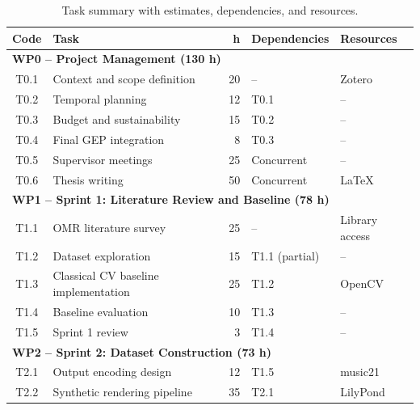 \documentclass[11pt, a4paper]{article}
\begin{document}
\begin{table}[h!]
    \centering
    \caption{Task summary with estimates, dependencies, and resources.}
    \label{tab:task-summary}
    \renewcommand{\arraystretch}{1.05}
    \scriptsize
    \begin{tabularx}{\linewidth}{c >{\raggedright}p{4.2cm} r >{\raggedright\arraybackslash}p{2.2cm} >{\raggedright\arraybackslash}p{2.0cm}}
        \toprule
        \textbf{Code} & \textbf{Task} & \textbf{h} & \textbf{Dependencies} & \textbf{Resources} \\
        \midrule
        \multicolumn{5}{l}{\textbf{WP0 -- Project Management (130 h)}} \\
        \midrule
        T0.1 & Context and scope definition         & 20  & --           & Zotero \\
        T0.2 & Temporal planning                    & 12  & T0.1           & -- \\
        T0.3 & Budget and sustainability             & 15  & T0.2           & -- \\
        T0.4 & Final GEP integration                & 8   & T0.3           & -- \\
        T0.5 & Supervisor meetings                  & 25  & Concurrent     & -- \\
        T0.6 & Thesis writing                       & 50  & Concurrent     & LaTeX \\
        \midrule
        \multicolumn{5}{l}{\textbf{WP1 -- Sprint 1: Literature Review and Baseline (78 h)}} \\
        \midrule
        T1.1 & OMR literature survey                & 25  & --           & Library access \\
        T1.2 & Dataset exploration                  & 15  & T1.1 (partial) & -- \\
        T1.3 & Classical CV baseline implementation  & 25  & T1.2           & OpenCV \\
        T1.4 & Baseline evaluation                  & 10  & T1.3           & -- \\
        T1.5 & Sprint 1 review                      & 3   & T1.4           & -- \\
        \midrule
        \multicolumn{5}{l}{\textbf{WP2 -- Sprint 2: Dataset Construction (73 h)}} \\
        \midrule
        T2.1 & Output encoding design               & 12  & T1.5           & music21 \\
        T2.2 & Synthetic rendering pipeline         & 35  & T2.1           & LilyPond \\

\end{tabularx}
\end{table}
\end{document}
